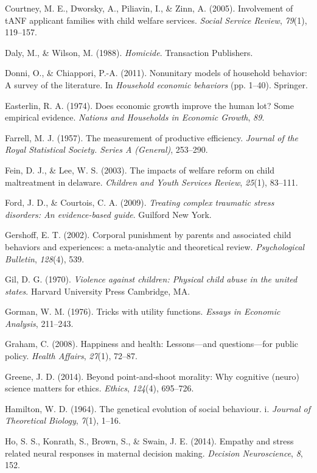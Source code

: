 \documentclass[]{elsarticle}
\begin{document}
Courtney, M. E., Dworsky, A., Piliavin, I., \& Zinn, A. (2005).
Involvement of tANF applicant families with child welfare services.
\emph{Social Service Review}, \emph{79}(1), 119--157.

Daly, M., \& Wilson, M. (1988). \emph{Homicide}. Transaction Publishers.

Donni, O., \& Chiappori, P.-A. (2011). Nonunitary models of household
behavior: A survey of the literature. In \emph{Household economic
behaviors} (pp. 1--40). Springer.

Easterlin, R. A. (1974). Does economic growth improve the human lot?
Some empirical evidence. \emph{Nations and Households in Economic
Growth}, \emph{89}.

Farrell, M. J. (1957). The measurement of productive efficiency.
\emph{Journal of the Royal Statistical Society. Series A (General)},
253--290.

Fein, D. J., \& Lee, W. S. (2003). The impacts of welfare reform on
child maltreatment in delaware. \emph{Children and Youth Services
Review}, \emph{25}(1), 83--111.

Ford, J. D., \& Courtois, C. A. (2009). \emph{Treating complex traumatic
stress disorders: An evidence-based guide}. Guilford New York.

Gershoff, E. T. (2002). Corporal punishment by parents and associated
child behaviors and experiences: a meta-analytic and theoretical review.
\emph{Psychological Bulletin}, \emph{128}(4), 539.

Gil, D. G. (1970). \emph{Violence against children: Physical child abuse
in the united states}. Harvard University Press Cambridge, MA.

Gorman, W. M. (1976). Tricks with utility functions. \emph{Essays in
Economic Analysis}, 211--243.

Graham, C. (2008). Happiness and health: Lessons---and questions---for
public policy. \emph{Health Affairs}, \emph{27}(1), 72--87.

Greene, J. D. (2014). Beyond point-and-shoot morality: Why cognitive
(neuro) science matters for ethics. \emph{Ethics}, \emph{124}(4),
695--726.

Hamilton, W. D. (1964). The genetical evolution of social behaviour. i.
\emph{Journal of Theoretical Biology}, \emph{7}(1), 1--16.

Ho, S. S., Konrath, S., Brown, S., \& Swain, J. E. (2014). Empathy and
stress related neural responses in maternal decision making.
\emph{Decision Neuroscience}, \emph{8}, 152.
\end{document}

